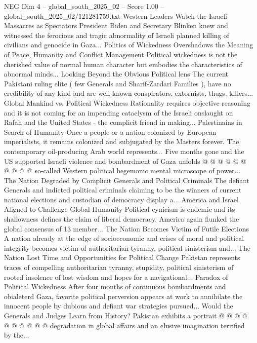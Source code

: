 \begin{textsample}{NEG Dim 4 – global\_south\_2025\_02 – Score 1.00 – global\_south\_2025\_02/121281759.txt}  \label{ex:f4_neg_439}
Western Leaders Watch the Israeli Massacres as Spectators President Biden and Secretary Blinken knew and witnessed the ferocious and tragic abnormality of Israeli planned killing of civilians and genocide in Gaza...
Politics of Wickedness Overshadows the Meaning of Peace, Humanity and Conflict Management Political wickedness is not the cherished value of normal human character but embodies the characteristics of abnormal minds...
Looking Beyond the Obvious Political lens The current Pakistani ruling elite ( few Generals and Sharif-Zardari Families ), have no credibility of any kind and are well known conspirators, extornists, thugs, killers...
Global Mankind vs.
Political Wickedness Rationality requires objective reasoning and it is not coming for an impending cataclysm of the Israeli onslaught on Rafah and the United States - the complicit friend in making...
Palestinains in Search of Humanity Once a people or a nation colonized by European imperialists, it remains colonized and subjugated by the Masters forever.
The contemporary oil-producing Arab world represents...
Five months gone and the US supported Israeli violence and bombardment of Gaza unfolds @ @ @ @ @ @ @ @ @ @ so-called Western political hegemonic mental microscope of power...
The Nation Degraded by Complicit Generals and Political Criminals The defiant Generals and indicted political criminals claiming to be the winners of current national elections and custodian of democracy display a...
America and Israel Aligned to Challenge Global Humanity Political cynicism is endemic and its shallowness defines the claim of liberal democracy.
America again flunked the global consensus of 13 member...
The Nation Becomes Victim of Futile Elections A nation already at the edge of socioeconomic and crises of moral and political integrity becomes victim of authoritarian tyranny, political sinisterism and...
The Nation Lost Time and Opportunities for Political Change Pakistan represents traces of compelling authoritarian tyranny, stupidity, political sinisterism of rooted insolence of lost wisdom and hopes for a navigational...
Paradox of Political Wickedness After four months of continuous bombardments and obialeterd Gaza, favorite political perversion appears at work to annihilate the innocent people by dubious and defiant war strategies pursued...
Would the Generals and Judges Learn from History?
Pakistan exhibits a portrait @ @ @ @ @ @ @ @ @ @ degradation in global affairs and an elusive imagination terrified by the...

\end{textsample}
